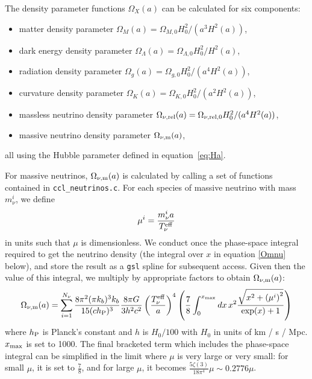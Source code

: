 \documentclass[\docopts]{\docclass}
\begin{document}
The density parameter functions $\Omega_X(a)$ can be calculated for six components:
\begin{itemize}
\item matter density parameter $\Omega_M(a) = \Omega_{M,0} H_0^2 / (a^3 H^2(a) )$,
\item dark energy density parameter $\Omega_\Lambda(a) = \Omega_{\Lambda,0} H_0^2 / H^2(a)$,
\item radiation density parameter $\Omega_g(a) = \Omega_{g,0} H_0^2 / (a^4 H^2(a) )$,
\item curvature density parameter $\Omega_K(a) = \Omega_{K,0} H_0^2 / (a^2 H^2(a) )$,
\item massless neutrino density parameter $\Omega_{\nu, {\rm rel}}(a) = \Omega_{\nu, {\rm rel},0} H_0^2 / (a^4 H^2(a) )$,
\item massive neutrino density parameter $\Omega_{\nu, {\rm m}}(a)$,
\end{itemize}
all using the Hubble parameter defined in equation~\ref{eq:Ha}.

For massive neutrinos, $\Omega_{\nu, {\rm m}}(a)$ is calculated by calling a set of functions contained in {\tt ccl\_neutrinos.c}. For each species of massive neutrino with mass $m_\nu^i$, we define
\begin{equation}
\mu^i = \frac{m_{\nu}^{i}a}{T_{\nu}^{\rm eff}}
\label{mnuOT}
\end{equation}
in units such that $\mu$ is dimensionless. We conduct once the phase-space integral required to get the neutrino density (the integral over $x$ in equation \ref{Omnu} below), and store the result as a {\tt gsl} spline for subsequent access. Given then the value of this integral, we multiply by appropriate factors to obtain $\Omega_{\nu, {\rm m}}(a)$:
\begin{equation}
\Omega_{\nu, {\rm m}}(a) = \sum_{i=1}^{N_\nu} \frac{8 \pi^2(\pi k_b )^3 k_b}{15(c h_{\rm P})^3} \frac{8 \pi G}{3h^2c^2} \left(\frac{T_{\nu}^{\rm eff}}{a}\right)^4 \left(\frac{7}{8}\int_0^{x_{\rm max}} dx \, x^2 \frac{\sqrt{x^2 + \left(\mu^i\right)^2}}{\exp(x) + 1}\right)
\label{Omnu}
\end{equation}
where $h_{\rm P}$ is Planck's constant and $h$ is $H_0/100$ with $H_0$ in units of km / s / Mpc. $x_{\rm max}$ is set to 1000. The final bracketed term which includes the phase-space integral can be simplified in the limit where $\mu$ is very large or very small: for small $\mu$, it is set to $\frac{7}{8}$, and for large $\mu$, it becomes $\frac{5\zeta(3)}{18\pi^4}\mu\sim 0.2776\mu$.
\end{document}

